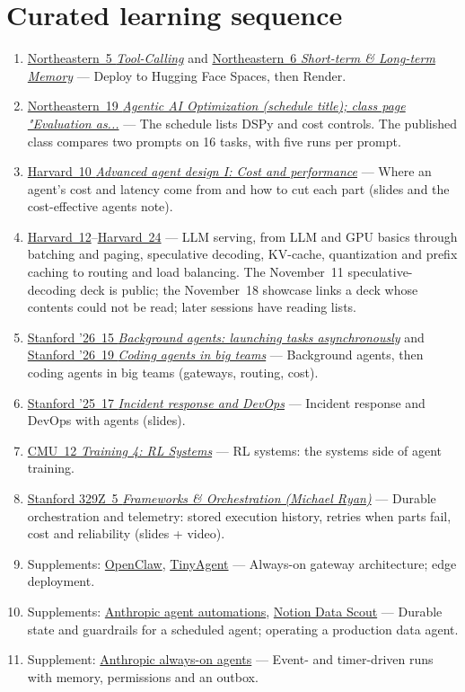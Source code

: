 \documentclass[10pt,oneside]{report}
\begin{document}
\section{Curated learning sequence}
\begin{enumerate}
\item \hyperlink{lec-NEU-5}{Northeastern~5 \emph{Tool-Calling}} and \hyperlink{lec-NEU-6}{Northeastern~6 \emph{Short-term \& Long-term Memory}} --- Deploy to Hugging Face Spaces, then Render.
\item \hyperlink{lec-NEU-19}{Northeastern~19 \emph{Agentic AI Optimization (schedule title); class page "Evaluation as...}} --- The schedule lists DSPy and cost controls. The published class compares two prompts on 16 tasks, with five runs per prompt.
\item \hyperlink{lec-HARV-10}{Harvard~10 \emph{Advanced agent design I: Cost and performance}} --- Where an agent's cost and latency come from and how to cut each part (slides and the cost-effective agents note).
\item \hyperlink{lec-HARV-12}{Harvard~12}--\hyperlink{lec-HARV-24}{Harvard~24} --- LLM serving, from LLM and GPU basics through batching and paging, speculative decoding, KV-cache, quantization and prefix caching to routing and load balancing. The November~11 speculative-decoding deck is public; the November~18 showcase links a deck whose contents could not be read; later sessions have reading lists.
\item \hyperlink{lec-STAN26-15}{Stanford '26~15 \emph{Background agents: launching tasks asynchronously}} and \hyperlink{lec-STAN26-19}{Stanford '26~19 \emph{Coding agents in big teams}} --- Background agents, then coding agents in big teams (gateways, routing, cost).
\item \hyperlink{lec-STAN25-17}{Stanford '25~17 \emph{Incident response and DevOps}} --- Incident response and DevOps with agents (slides).
\item \hyperlink{lec-CMU-12}{CMU~12 \emph{Training 4: RL Systems}} --- RL systems: the systems side of agent training.
\item \hyperlink{lec-S329Z-5}{Stanford 329Z~5 \emph{Frameworks \& Orchestration (Michael Ryan)}} --- Durable orchestration and telemetry: stored execution history, retries when parts fail, cost and reliability (slides + video).
\item Supplements: \hyperref[sup-openclaw]{OpenClaw}, \hyperref[sup-tinyagent]{TinyAgent} --- Always-on gateway architecture; edge deployment.
\item Supplements: \hyperref[sup-anthauto]{Anthropic agent automations}, \hyperref[sup-notion]{Notion Data Scout} --- Durable state and guardrails for a scheduled agent; operating a production data agent.
\item Supplement: \hyperref[sup-alwayson]{Anthropic always-on agents} --- Event- and timer-driven runs with memory, permissions and an outbox.
\end{enumerate}
\end{document}
